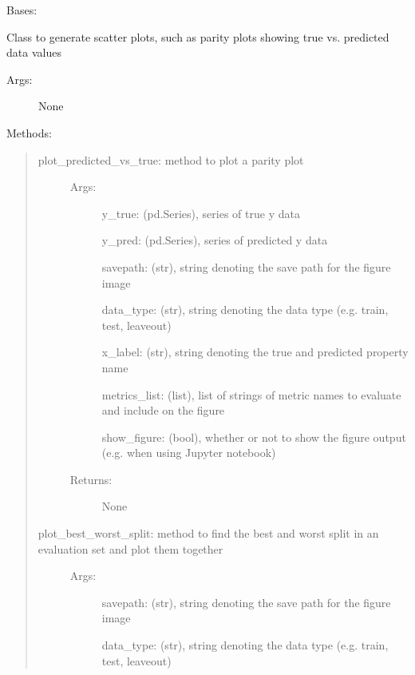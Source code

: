 \documentclass[letterpaper,10pt,english]{sphinxmanual}
\begin{document}
\begin{fulllineitems}
\label{\detokenize{api/mastml.plots.Scatter:mastml.plots.Scatter}}
Bases: 

Class to generate scatter plots, such as parity plots showing true vs. predicted data values
\begin{description}
\item[{Args:}] \leavevmode
None

\end{description}

Methods:
\begin{quote}
\begin{description}
\item[{plot\_predicted\_vs\_true: method to plot a parity plot}] \leavevmode\begin{description}
\item[{Args:}] \leavevmode
y\_true: (pd.Series), series of true y data

y\_pred: (pd.Series), series of predicted y data

savepath: (str), string denoting the save path for the figure image

data\_type: (str), string denoting the data type (e.g. train, test, leaveout)

x\_label: (str), string denoting the true and predicted property name

metrics\_list: (list), list of strings of metric names to evaluate and include on the figure

show\_figure: (bool), whether or not to show the figure output (e.g. when using Jupyter notebook)

\item[{Returns:}] \leavevmode
None

\end{description}

\item[{plot\_best\_worst\_split: method to find the best and worst split in an evaluation set and plot them together}] \leavevmode\begin{description}
\item[{Args:}] \leavevmode
savepath: (str), string denoting the save path for the figure image

data\_type: (str), string denoting the data type (e.g. train, test, leaveout)


\end{description}
\end{description}
\end{quote}
\end{fulllineitems}
\end{document}

